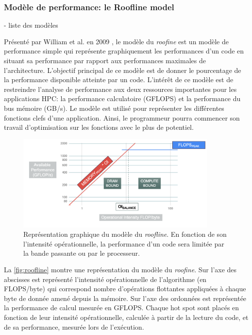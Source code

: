     \subsubsection{Modèle de performance: le Roofline model} \label{sec:roofline}
        
                - liste des modèles
    
            Présenté par William et al. en 2009 \cite{Williams2008}, le modèle du \textit{roofine} est un modèle de performance simple qui représente graphiquement les performances d’un code en situant sa performance par rapport aux performances maximales de l’architecture. L’objectif principal de ce modèle est de donner le pourcentage de la performance disponible atteinte par un code. L’intérêt de ce modèle est de restreindre l’analyse de performance aux deux ressources importantes pour les applications HPC: la performance calculatoire (GFLOPS) et la performance du bus mémoire (GB/s).
            Le modèle est utilisé pour représenter les différentes fonctions clefs d’une application. Ainsi, le programmeur pourra commencer son travail d’optimisation sur les fonctions avec le plus de potentiel.
            
            \begin{figure}
                \center
                \includegraphics[width=10cm]{images/roofline.png}
                \caption{\label{fig:roofline} Représentation graphique du modèle du \textit{roofline}. En fonction de son l'intensité opérationnelle, la performance d'un code sera limitée par la bande passante ou par le processeur.}
            \end{figure}
            
            
            La \autoref{fig:roofline} montre une représentation du modèle du \textit{roofine}. Sur l’axe des abscisses est représenté l’intensité opérationnelle de l’algorithme (en FLOPS/byte) qui correspond nombre d’opérations flottantes appliquées à chaque byte de donnée amené depuis la mémoire. Sur l’axe des ordonnées est représentée la performance de calcul mesurée en GFLOPS.
            Chaque hot spot sont placés en fonction de leur intensité opérationnelle, calculée à partir de la lecture du code, et de sa performance, mesurée lors de l’exécution.
        

